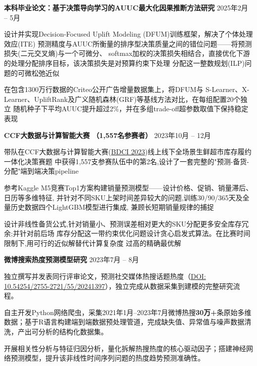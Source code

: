 \documentclass[11pt]{article}
\newcommand{\projheader}[2]{%
  \vspace{1pt}%
  {\textbf{#1} \hfill #2} \\[-4pt]
}
\begin{document}
\projheader{本科毕业论文：基于决策导向学习的AUUC最大化因果推断方法研究}{2025年2月 -- 5月}
\begin{rbullet}
  \item 设计并实现Decision-Focused Uplift Modeling (DFUM)训练框架，解决了个体处理效应(ITE)
预测精度与AUUC所衡量的排序型决策质量之间的错位问题——将预测损失(二元交叉熵)与一个可微分、
softmax加权的决策损失相结合，直接优化下游的处理分配排序目标，该决策损失是对预算约束下处理
分配这一整数规划(ILP)问题的可微松弛近似
  \item 在包含1300万行数据的Criteo公开广告增量数据集上，将DFUM与
S-Learner、X-Learner、UpliftRank及广义随机森林(GRF)等基线方法对比，在每组配置20个独立
随机种子下平均AUUC提升超过2\%，并在多组trade-off超参数取值下保持稳定表现
\end{rbullet}

\vspace{1pt}

\projheader{CCF大数据与计算智能大赛 \textnormal{（1,557名参赛者）}}{2023年10月 -- 12月}
\begin{rbullet}
  \item 带队在CCF大数据与计算智能大赛(\href{https://www.ccf.org.cn/}{BDCI 2023})线上线下全场景生鲜超市库存履约一体化决策赛题
中获得1,557支参赛队伍中的第2名,设计了一套完整的"预测-备货-分配"端到端决策pipeline
  \item 参考Kaggle M5竞赛Top1方案构建销量预测模型——设计价格、促销、销量滞后、日历等多维特征,
  并针对不同SKU上架时间差异较大的问题,训练30/90/365天及全量历史数据四个LightGBM模型进行集成,
  兼顾长短期销量规律的捕捉
  \item 设计非线性备货公式,针对销量小、预测误差相对更大的SKU分配更多安全库存冗余;并针对前后场
  库存分配这一带约束优化问题设计贪心启发式算法。在比赛时间限制下,用可行的近似解替代计算复杂度
  过高的精确最优解
\end{rbullet}

\vspace{1pt}

\projheader{微博搜索热度预测模型研究}{2023年7月 -- 8月}
\begin{rbullet}
  \item 独立撰写并发表同行评审论文，预测社交媒体热搜话题热度（\href{https://doi.org/10.54254/2755-2721/55/20241397}{DOI: 10.54254/2755-2721/55/20241397}），独立完成从数据采集到建模的完整研究流程。
  \item 自主开发Python网络爬虫，采集2021年1月–2023年7月微博热搜\textbf{30万+}条原始多维数据；基于R语言构建端到端数据预处理管道，完成缺失值、异常值与噪声数据清洗，产出可分析的结构化数据集。
  \item 开展相关性分析与特征归因分析，量化拆解热搜热度的核心驱动因子；搭建神经网络预测模型，提升该非线性时间序列问题的热度趋势预测准确性。
\end{rbullet}
\end{document}
